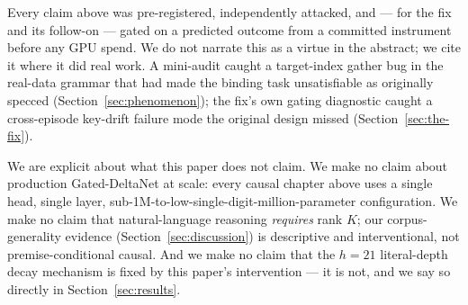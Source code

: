 Every claim above was pre-registered, independently attacked, and --- for
the fix and its follow-on --- gated on a predicted outcome from a
committed instrument before any GPU spend. We do not narrate this as a
virtue in the abstract; we cite it where it did real work. A mini-audit
caught a target-index gather bug in the real-data grammar that had made
the binding task unsatisfiable as originally specced
(Section~\ref{sec:phenomenon}); the fix's own gating diagnostic caught a
cross-episode key-drift failure mode the original design missed
(Section~\ref{sec:the-fix}).

We are explicit about what this paper does not claim. We make no claim
about production Gated-DeltaNet at scale: every causal chapter above uses
a single head, single layer, sub-1M-to-low-single-digit-million-parameter
configuration. We make no claim that natural-language reasoning
\emph{requires} rank $K$; our corpus-generality evidence
(Section~\ref{sec:discussion}) is descriptive and interventional, not
premise-conditional causal. And we make no claim that the $h{=}21$
literal-depth decay mechanism is fixed by this paper's intervention --- it
is not, and we say so directly in Section~\ref{sec:results}.
